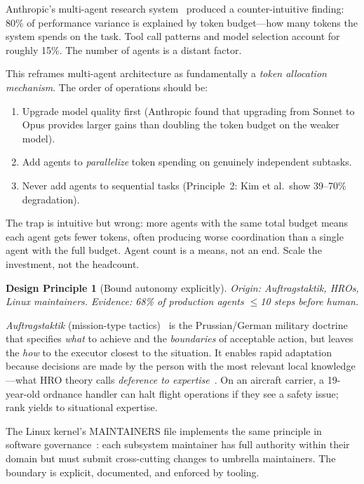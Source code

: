 \documentclass{article}
\newtheorem{principle}{Design Principle}
\begin{document}
Anthropic's multi-agent research system~\citep{anthropic2025building} produced a
counter-intuitive finding: 80\% of performance variance is explained by token
budget---how many tokens the system spends on the task. Tool call patterns and model
selection account for roughly 15\%. The number of agents is a distant factor.

This reframes multi-agent architecture as fundamentally a \emph{token allocation
mechanism}. The order of operations should be:
\begin{enumerate}[nosep]
  \item Upgrade model quality first (Anthropic found that upgrading from Sonnet to Opus
    provides larger gains than doubling the token budget on the weaker model).
  \item Add agents to \emph{parallelize} token spending on genuinely independent
    subtasks.
  \item Never add agents to sequential tasks (Principle~2: Kim et al.\ show 39--70\%
    degradation).
\end{enumerate}

\noindent
The trap is intuitive but wrong: more agents with the same total budget means each agent
gets fewer tokens, often producing worse coordination than a single agent with the full
budget. Agent count is a means, not an end. Scale the investment, not the headcount.

\begin{principle}[Bound autonomy explicitly]
\emph{Origin}: Auftragstaktik, HROs, Linux maintainers.
\emph{Evidence}: 68\% of production agents $\leq$10 steps before human.
\end{principle}

\emph{Auftragstaktik} (mission-type tactics)~\citep{matzenbacher2018mission} is the
Prussian/German military doctrine that specifies \emph{what} to achieve and the
\emph{boundaries} of acceptable action, but leaves the \emph{how} to the executor closest
to the situation. It enables rapid adaptation because decisions are made by the person
with the most relevant local knowledge---what HRO theory calls \emph{deference to
expertise}~\citep{weick2015managing}. On an aircraft carrier, a 19-year-old ordnance
handler can halt flight operations if they see a safety issue; rank yields to situational
expertise.

The Linux kernel's MAINTAINERS file implements the same principle in software
governance~\citep{raymond1999cathedral}: each subsystem maintainer has full authority
within their domain but must submit cross-cutting changes to umbrella maintainers. The
boundary is explicit, documented, and enforced by tooling.
\end{document}
